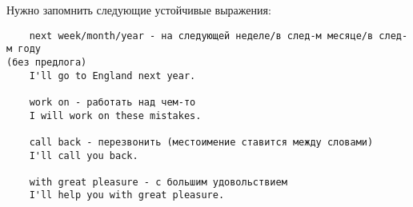 Нужно запомнить следующие устойчивые выражения:
\begin{verbatim}
    next week/month/year - на следующей неделе/в след-м месяце/в след-м году
(без предлога)
    I'll go to England next year.

    work on - работать над чем-то
    I will work on these mistakes.

    call back - перезвонить (местоимение ставится между словами)
    I'll call you back.

    with great pleasure - с большим удовольствием
    I'll help you with great pleasure.
\end{verbatim}